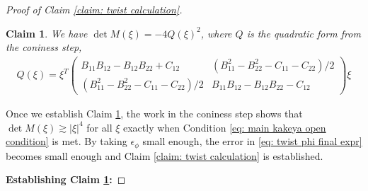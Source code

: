 \documentclass[12pt]{amsart}
\numberwithin{equation}{section}
\newtheorem{claim}[lemma]{Claim}
\newcommand{\1}{\mathbbm{1}}
\begin{document}
\begin{proof}[Proof of Claim \ref{claim: twist calculation}]
    \begin{claim}\label{claim: M quadratic form}
        We have $\det M(\xi) = -4 Q(\xi)^2$, where $Q$ is the quadratic form from the coniness step,
        \begin{align}
            Q(\xi) = \xi^T 
            \begin{pmatrix}
                B_{11} B_{12}-B_{12} B_{22}  + C_{12} & (B_{11}^2 - B_{22}^2 - C_{11} - C_{22})/2 \\
                (B_{11}^2 - B_{22}^2 - C_{11} - C_{22})/2 & 
                B_{11} B_{12} - B_{12} B_{22} - C_{12}
            \end{pmatrix}
            \xi
        \end{align}
    \end{claim}
    Once we establish Claim \ref{claim: M quadratic form}, the work in the coniness step shows that $\det M(\xi) \gtrsim |\xi|^4$ for all $\xi$ exactly when Condition \eqref{eq: main kakeya open condition} is met. By taking $\epsilon_\phi$ small enough, the error in \eqref{eq: twist phi final expr} becomes small enough and Claim \ref{claim: twist calculation} is established. 

    \medskip

    \noindent \textbf{Establishing Claim \ref{claim: M quadratic form}: }


\end{proof}
\end{document}
